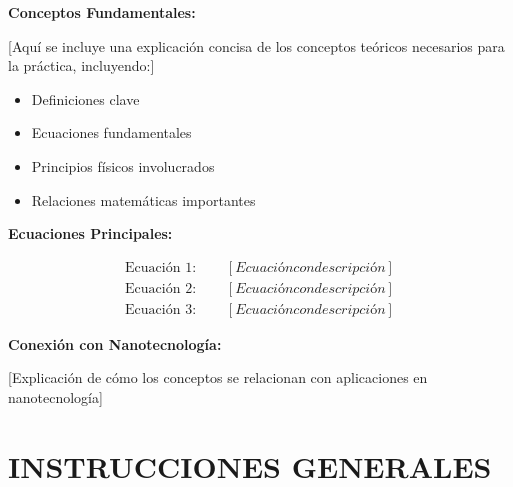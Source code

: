 \documentclass[12pt,a4paper]{article}
\begin{document}
	\begin{teoriabox}
		\textbf{Conceptos Fundamentales:}
		
		[Aquí se incluye una explicación concisa de los conceptos teóricos necesarios para la práctica, incluyendo:]
		
		\begin{itemize}
			\item Definiciones clave
			\item Ecuaciones fundamentales
			\item Principios físicos involucrados
			\item Relaciones matemáticas importantes
		\end{itemize}
		
		\textbf{Ecuaciones Principales:}
		
		\begin{align}
			\text{Ecuación 1: } \quad & [Ecuación con descripción] \\
			\text{Ecuación 2: } \quad & [Ecuación con descripción] \\
			\text{Ecuación 3: } \quad & [Ecuación con descripción]
		\end{align}
		
		\textbf{Conexión con Nanotecnología:}
		
		[Explicación de cómo los conceptos se relacionan con aplicaciones en nanotecnología]
	\end{teoriabox}
	
	
	\section{INSTRUCCIONES GENERALES}
	
\end{document}
